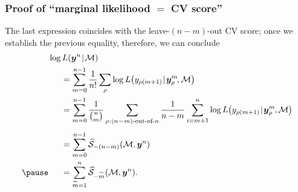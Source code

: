 \documentclass[18pt]{beamer}
\newcommand{\defineTightSpacing}{%
	\setlength{\abovedisplayskip}{.25\baselineskip}%
	\setlength{\belowdisplayskip}{.25\baselineskip}%
}
\newcommand{\given}{\thinnerspace | \thinnerspace}
\newcommand{\spacedColon}{\mkern .5mu : \mkern 1mu}
\newcommand{\thinnerspace}{\mskip.5\thinmuskip}
\newcommand{\negthinnerspace}{\mskip-.5\thinmuskip}
\newcommand{\likelihood}{L}
\newcommand{\by}{\bm{y}}
\newcommand{\score}{\mathcal{S}}
\newcommand{\modelSymbol}{\mathcal{M}}
\newcommand{\permutation}{\rho}
\newcommand{\trainingSize}{m}
\newcommand{\testSampleIndex}{i}
\begin{document}
\begin{frame}
\frametitle{Proof of ``marginal likelihood $=$ {\large CV} score''}
The last expression coincides with the leave-$(n - \trainingSize)$-out CV score;
\pause
once we establish the previous equality, therefore, we can conclude
\begin{equation*} \defineTightSpacing%
\begin{aligned}
&\log \likelihood(\by^n \given \modelSymbol) \\
	&\hspace*{1.5em}= \sum_{\trainingSize = 0}^{n - 1} \frac{1}{n!} \sum_\permutation  \log \likelihood\!\left(y_{\permutation(\trainingSize + 1)} \given \by_\permutation^\trainingSize\negthinnerspace, \modelSymbol \right) \\
	&\hspace*{1.5em}= \sum_{\trainingSize = 0}^{n - 1} \frac{1}{{n \choose \trainingSize}} \sum_{\permutation \spacedColon \text{$(n\!-\!\trainingSize)$-out-of-$n$}} 
	\frac{1}{n - \trainingSize} \sum_{\testSampleIndex = \trainingSize + 1}^n
		\log \likelihood\!\left(y_{\permutation(\trainingSize + 1)} \given \by_\permutation^\trainingSize\negthinnerspace, \modelSymbol \right) \\[.25\baselineskip]
	&\hspace*{1.5em}= \sum_{\trainingSize = 0}^{n - 1} \widehat{\score}_{-(n - \trainingSize)}(\modelSymbol, \by^n) \\
	\pause
	&\hspace*{1.5em}= \sum_{\widetilde{\trainingSize} = 1}^{n} \widehat{\score}_{-\widetilde{\trainingSize}}(\modelSymbol, \by^n).
\end{aligned}
\end{equation*}
\end{frame}
\end{document}

